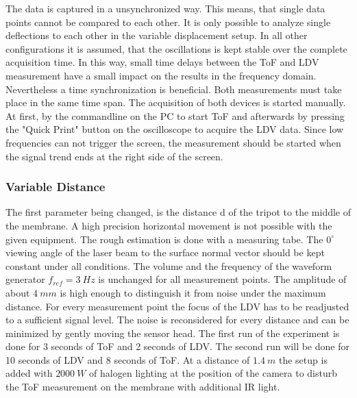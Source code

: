 The data is captured in a unsynchronized way. This means, that single data points cannot be compared to each other. It is only possible to analyze single deflections to each other in the variable displacement setup. In all other configurations it is assumed, that the oscillations is kept stable over the complete acquisition time. In this way, small time delays between the ToF and LDV measurement have a small impact on the results in the frequency domain. Nevertheless a time synchronization is beneficial. Both measurements must take place in the same time span. The acquisition of both devices is started manually. At first, by the commandline on the PC to start ToF and afterwards by pressing the "Quick Print" button on the oscilloscope to acquire the LDV data. Since low frequencies can not trigger the screen, the measurement should be started when the signal trend ends at the right side of the screen.    

\subsubsection{Variable Distance}
The first parameter being changed, is the distance d of the tripot to the middle of the membrane. A high precision horizontal movement is not possible with the given equipment. The rough estimation is done with a measuring tabe. The $0^\circ$ viewing angle of the laser beam to the surface normal vector should be kept constant under all conditions. The volume and the frequency of the waveform generator $f_{ref}=3~Hz$ is unchanged for all measurement points. The  amplitude of about $4~mm$ is high enough to distinguish it from noise under the maximum distance. For every measurement point the focus of the LDV has to be readjusted to a sufficient signal level. The noise is reconsidered for every distance and can be minimized by gently moving the sensor head. The first run of the experiment is done for 3 seconds of ToF and 2 seconds of LDV. The second run will be done for 10 seconds of LDV and 8 seconds of ToF. At a distance of $1.4~m$ the setup is added with $2000~W$ of halogen lighting at the position of the camera to disturb the ToF measurement on the membrane with additional IR light.

